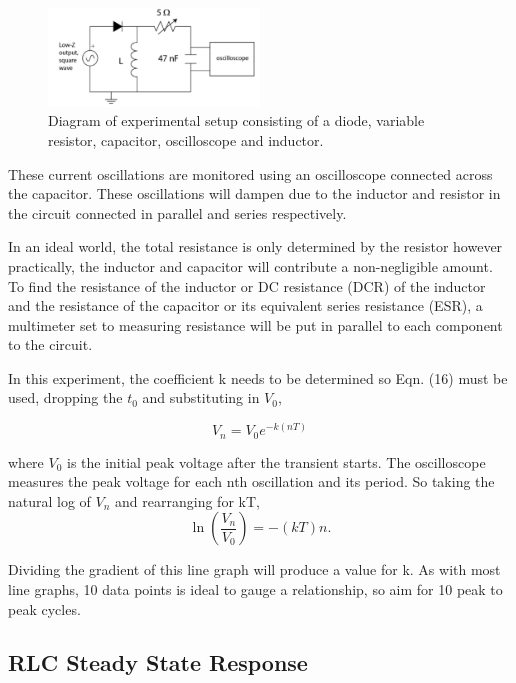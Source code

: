 \documentclass{article}
\begin{document}
\begin{figure}[H]
    \centering
    \includegraphics[width=0.5\textwidth]{circuit2.png}
    \caption{Diagram of experimental setup consisting of a diode, variable
    resistor, capacitor, oscilloscope and inductor.}
    \label{fig:circuit3}
\end{figure}

These current oscillations are monitored using an oscilloscope connected 
across the capacitor. These oscillations will dampen due to the inductor 
and resistor in the circuit connected in parallel and series respectively.

In an ideal world, the total resistance is only determined by the resistor
however practically, the inductor and capacitor will contribute a 
non-negligible amount. To find the resistance of the inductor or DC 
resistance (DCR) of the inductor and the resistance of the capacitor or its
equivalent series resistance (ESR), a multimeter set to measuring resistance
will be put in parallel to each component to the circuit.

In this experiment, the coefficient k needs to be determined so
Eqn. (16) must be used, dropping the $t_0$ and substituting in $V_0$,

\begin{equation}
    V_n=V_0e^{-k(nT)}
\end{equation}

where $V_0$ is the initial peak voltage after the transient starts.
The oscilloscope measures the peak voltage for each nth oscillation
and its period. So taking the natural log of $V_n$ and rearranging 
for kT,
\begin{equation}
        \ln(\frac{V_n}{V_0}) =-(kT)n.
\end{equation}

Dividing the gradient of this line graph will produce a value for k.
As with most line graphs, 10 data points is ideal to gauge a 
relationship, so aim for 10 peak to peak cycles.

\subsection{RLC Steady State Response}
\end{document}
